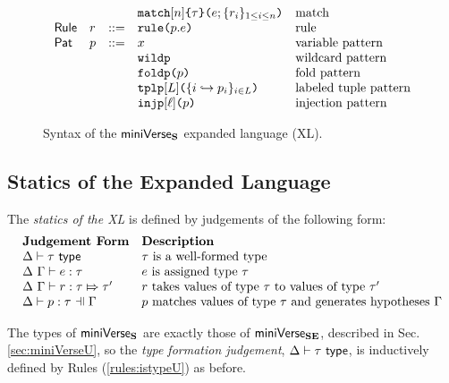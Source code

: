 {{{{\begin{figure}
\[\begin{array}{lllllll}
&&
& \aematchwith{n}{\tau}{e}{\seqschemaX{r}}
& \text{match}\\
\mathsf{Rule} & r & ::= 
& \aematchrule{p}{e} 
& \text{rule}\\
\mathsf{Pat} & p & ::= 
& x  
& \text{variable pattern}\\
&&& \aewildp 
& \text{wildcard pattern}\\
&&& \aefoldp{p} 
& \text{fold pattern}\\
&&& \aetplp{\labelset}{\mapschema{p}{i}{\labelset}} 
& \text{labeled tuple pattern}\\
&&& \aeinjp{\ell}{p} 
& \text{injection pattern} %
\end{array}\]
\caption{Syntax of the $\mathsf{miniVerse}_\textbf{S}$ expanded language (XL).}
\label{fig:UP-expanded-terms}
\end{figure}


\subsection{Statics of the Expanded Language}\label{sec:inner-core-statics-UP}
The \emph{statics of the XL} is defined by judgements of the following form:
\[\begin{array}{ll}
\textbf{Judgement Form} & \textbf{Description}\\
\istypeU{\Delta}{\tau} & \text{$\tau$ is a well-formed type}\\
\hastypeU{\Delta}{\Gamma}{e}{\tau} & \text{$e$ is assigned type $\tau$}\\
\ruleType{\Delta}{\Gamma}{r}{\tau}{\tau'} & \text{$r$ takes values of type $\tau$ to values of type $\tau'$}\\
\patType{\pctx}{p}{\tau} & \text{$p$ matches values of type $\tau$ and generates hypotheses $\pctx$} 
\end{array}\]

The types of $\mathsf{miniVerse}_\textbf{S}$ are exactly those of $\mathsf{miniVerse}_\textbf{SE}$, described in Sec. \ref{sec:miniVerseU}, so the \emph{type formation judgement}, $\Delta \vdash \tau~\mathsf{type}$, is inductively defined by Rules (\ref{rules:istypeU}) as before.

}}}}
